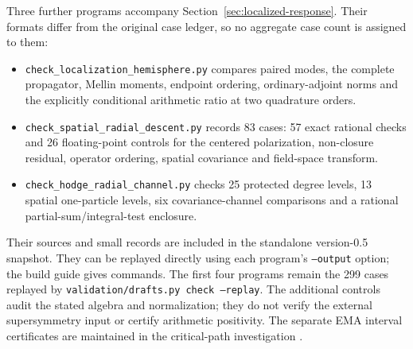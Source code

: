 Three further programs accompany Section~\ref{sec:localized-response}.
Their formats differ from the original case ledger, so no aggregate
case count is assigned to them:
\begin{itemize}
 \item \nolinkurl{check_localization_hemisphere.py} compares paired
 modes, the complete propagator, Mellin moments, endpoint ordering,
 ordinary-adjoint norms and the explicitly conditional arithmetic
 ratio at two quadrature orders.
 \item \nolinkurl{check_spatial_radial_descent.py} records 83 cases:
 57 exact rational checks and 26 floating-point controls for the
 centered polarization, non-closure residual, operator ordering,
 spatial covariance and field-space transform.
 \item \nolinkurl{check_hodge_radial_channel.py} checks 25 protected
 degree levels, 13 spatial one-particle levels, six covariance-channel
 comparisons and a rational partial-sum/integral-test enclosure.
\end{itemize}
Their sources and small records are included in the standalone
version-0.5 snapshot. They can be replayed directly using each
program's \texttt{--output} option; the build guide gives commands.
The first four programs remain the 299 cases replayed by
\texttt{validation/drafts.py check --replay}.
The additional controls audit the stated algebra and normalization;
they do not verify the external supersymmetry input or certify
arithmetic positivity. The separate EMA interval certificates are
maintained in the critical-path investigation \cite{EMAAnchor}.
